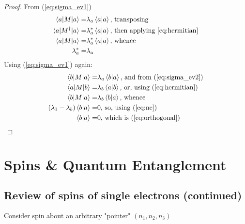 \documentclass[]{article}
\begin{document}
\begin{proof}
	From (\ref{eq:sigma_ev1})
	\begin{align*}
		\braket{a \vert M \vert a} =& \lambda_a \braket{a\vert a} \text{, transposing}\\
		\braket{a \vert M^\dagger \vert a} =& \lambda_a^* \braket{a\vert a} \text{, then applying \eqref{eq:hermitian}} \\
		\braket{a \vert M \vert a} =& \lambda_a^* \braket{a\vert a} \text{, whence}\\
		\lambda_a^* =& \lambda_a
	\end{align*}
	Using  (\ref{eq:sigma_ev1}) again:
	\begin{align*}
		\braket{b \vert M \vert a} =& \lambda_a \braket{b\vert a} \text{, and from (\ref{eq:sigma_ev2})}\\
		\braket{a \vert M \vert b} =& \lambda_b \braket{a\vert b} \text{, or, using (\ref{eq:hermitian})}\\
		\braket{b \vert M \vert a} =& \lambda_b \braket{b\vert a} \text{, whence}\\
		(\lambda_1-\lambda_b)\braket{b\vert a} =& 0 \text{, so, using (\ref{eq:ne})}\\
		\braket{b\vert a} =& 0\text{, which is (\ref{eq:orthogonal})}
	\end{align*}
\end{proof}

\section{Spins \& Quantum Entanglement}

\subsection{Review of spins of single electrons (continued)}

Consider spin about an arbitrary "pointer" $(n_1,n_2,n_3)$
\end{document}
